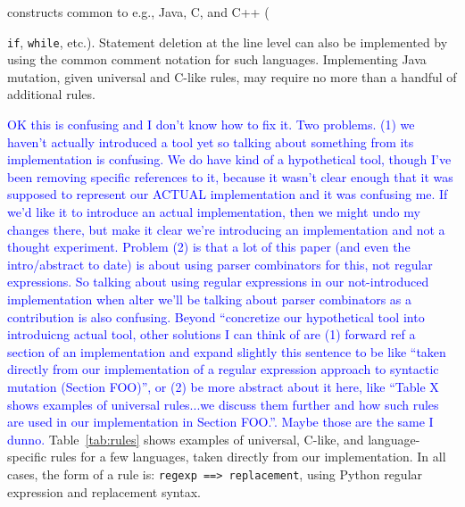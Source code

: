 \documentclass[sigconf,review, anonymous]{acmart}
\newcommand{\clg}[1]{\textcolor{blue}{#1}}
\begin{document}
constructs common to e.g.,  Java, C, and C++ ({{\tt if}, {\tt while},
  etc.).  Statement deletion at the line level can also be implemented
  by using the common comment notation for such languages.
  Implementing Java mutation, given universal and C-like rules, may
  require no more than a handful of additional rules.

\begin{table}[hbtp]
\centering
\caption{Rule Examples}
\label{tab:rules}

\end{table}
  
\clg{OK this is confusing and I don't know how to fix it.  Two problems.  (1) we
  haven't actually introduced a tool yet so talking about something from its
  implementation is confusing.  We do have kind of a hypothetical tool, though
  I've been removing specific references to it, because it wasn't clear enough
  that it was supposed to represent our ACTUAL implementation and it was
  confusing me.  If we'd like it to introduce an actual implementation, then we
  might undo my changes there, but make it clear we're introducing an
  implementation and not a thought experiment.  Problem (2) is that a lot of
  this paper (and even the intro/abstract to date) is about using parser
  combinators for this, not regular expressions.  So talking about using regular
  expressions in our not-introduced implementation when alter we'll be talking
  about parser combinators as a contribution is also confusing.  Beyond
  ``concretize our hypothetical tool into introduicng actual tool, other
  solutions I can think of are (1) forward ref a section of an implementation and expand slightly this
  sentence to be like ``taken directly from our implementation of a regular
  expression approach to syntactic mutation (Section FOO)'', or (2) be more abstract
  about it here, like ``Table X shows examples of universal rules...we discuss
  them further and how such rules are used in our implementation in Section
  FOO.''.  Maybe those are the same I dunno.}
Table~\ref{tab:rules} shows examples of universal, C-like, and
language-specific rules for a few languages, taken directly from our
implementation.  In all cases, the form of a rule is: {\tt regexp
  ==> replacement}, using Python regular expression and replacement syntax.

}
\end{document}
